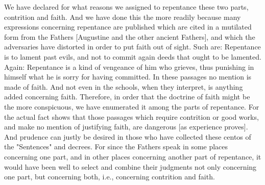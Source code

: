 We have declared for what reasons we assigned to repentance these two
parts, contrition and faith.  And we have done this the more readily
because many expressions concerning repentance are published which
are cited in a mutilated form from the Fathers [Augustine and the
other ancient Fathers], and which the adversaries have distorted in
order to put faith out of sight.  Such are: Repentance is to lament
past evils, and not to commit again deeds that ought to be lamented.
Again: Repentance is a kind of vengeance of him who grieves, thus
punishing in himself what he is sorry for having committed.  In these
passages no mention is made of faith.  And not even in the schools,
when they interpret, is anything added concerning faith.  Therefore,
in order that the doctrine of faith might be the more conspicuous, we
have enumerated it among the parts of repentance.  For the actual
fact shows that those passages which require contrition or good works,
and make no mention of justifying faith, are dangerous [as
experience proves].  And prudence can justly be desired in those who
have collected these centos of the "Sentences" and decrees.  For
since the Fathers speak in some places concerning one part, and in
other places concerning another part of repentance, it would have
been well to select and combine their judgments not only concerning
one part, but concerning both, i.e., concerning contrition and faith.

